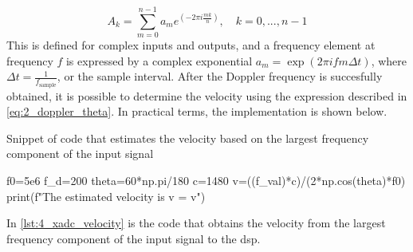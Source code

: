 \begin{equation} \label{eq:numpy_dft_formula}
	A_{k} = \sum_{m=0}^{n-1} a_{m} e^{\left( -2\pi i \frac{mk}{n}\right)}, \quad k=0,...,n-1
\end{equation}
This is defined for complex inputs and outputs, and a frequency element at frequency $f$ is expressed by a complex exponential $a_{m}=\exp{\left(2\pi i f m \Delta t\right)}$, where $\Delta t=\frac{1}{f_{\mathrm{sample}}}$, or the sample interval. After the Doppler frequency is succesfully obtained, it is possible to determine the velocity using the expression described in \cref{eq:2_doppler_theta}. In practical terms, the implementation is shown below.
\begin{listing}[htbp]
	\centering
	\caption{Snippet of code that estimates the velocity based on the largest frequency component of the input signal}
	\label{lst:4_xadc_velocity}
	\begin{mintedpython}
f0=5e6
f_d=200
theta=60*np.pi/180
c=1480
v=((f_val)*c)/(2*np.cos(theta)*f0)
print(f"The estimated velocity is v = {v}")
	\end{mintedpython}
\end{listing}
In \cref{lst:4_xadc_velocity} is the code that obtains the velocity from the largest frequency component of the input signal to the \gls{dsp}.